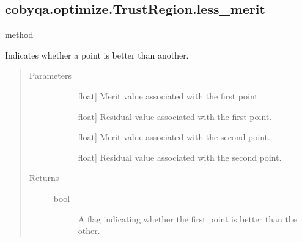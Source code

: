 \documentclass[letterpaper,10pt,english]{sphinxmanual}
\begin{document}
\begin{fulllineitems}
\subsection{cobyqa.optimize.TrustRegion.less\_merit}
\label{\detokenize{refs/generated/cobyqa.optimize.TrustRegion.less_merit:cobyqa-optimize-trustregion-less-merit}}\label{\detokenize{refs/generated/cobyqa.optimize.TrustRegion.less_merit::doc}}
\sphinxAtStartPar
method

\begin{fulllineitems}
\label{\detokenize{refs/generated/cobyqa.optimize.TrustRegion.less_merit:cobyqa.optimize.TrustRegion.less_merit}}
\sphinxAtStartPar
Indicates whether a point is better than another.
\begin{quote}\begin{description}
\item[{Parameters}] \leavevmode\begin{description}
\item[{}] \leavevmode{[}float{]}
\sphinxAtStartPar
Merit value associated with the first point.

\item[{}] \leavevmode{[}float{]}
\sphinxAtStartPar
Residual value associated with the first point.

\item[{}] \leavevmode{[}float{]}
\sphinxAtStartPar
Merit value associated with the second point.

\item[{}] \leavevmode{[}float{]}
\sphinxAtStartPar
Residual value associated with the second point.

\end{description}

\item[{Returns}] \leavevmode\begin{description}
\item[{bool}] \leavevmode
\sphinxAtStartPar
A flag indicating whether the first point is better than the other.

\end{description}


\end{description}
\end{quote}
\end{fulllineitems}
\end{fulllineitems}
\end{document}
